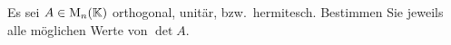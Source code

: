 \documentclass[a4paper, 10pt]{scrartcl}
\begin{document}
\begin{question}
  Es sei $A \in \operatorname{M}_{n}(\mathbb{K})$ orthogonal, unitär, bzw.\ hermitesch.
  Bestimmen Sie jeweils alle möglichen Werte von $\det A$.
\end{question}





\end{document}
